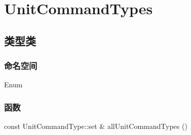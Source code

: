 \tableofcontents
\section{UnitCommandTypes}
\subsection{类型类}
\subsubsection{命名空间}
Enum
\subsubsection{函数}
\begin{codebox}[函数]
const UnitCommandType::set & allUnitCommandTypes ()
\end{codebox}
